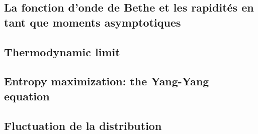 \subsection{La fonction d'onde de Bethe et les rapidités en tant que moments asymptotiques}


\subsection{Thermodynamic limit}


\subsection{Entropy maximization: the Yang-Yang equation}


%

\subsection{Fluctuation de la distribution}



